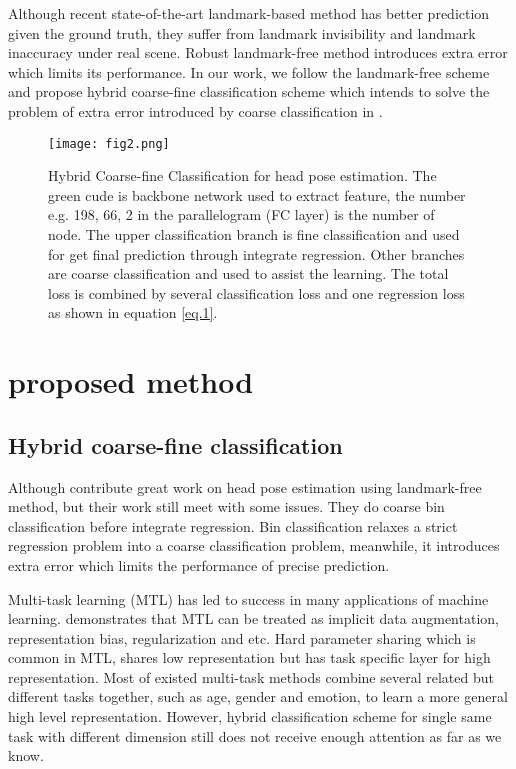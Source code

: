 \documentclass{article}
\begin{document}
\begin{CJK*}{UTF8}{gkai}
Although recent state-of-the-art landmark-based method has better prediction given the ground truth, they suffer from landmark invisibility and landmark inaccuracy under real scene. Robust landmark-free method introduces extra error which limits its performance. In our work, we follow the landmark-free scheme and propose hybrid coarse-fine classification scheme which intends to solve the problem of extra error introduced by coarse classification in \cite{ruiz2017fine}.

\begin{figure*}[h]
\centering
\texttt{[image: fig2.png]}
\caption{Hybrid Coarse-fine Classification for head pose estimation. The green cude is backbone network used to extract feature, the number e.g. 198, 66, 2 in the parallelogram (FC layer) is the number of node. The upper classification branch is fine classification and used for get final prediction through integrate regression. Other branches are coarse classification and used to assist the learning. The total loss is combined by several classification loss and one regression loss as shown in equation \eqref{eq.1}.}
\end{figure*}

\section{proposed method}
\label{sec:majhead}

\subsection{Hybrid coarse-fine classification}
\label{ssec:subhead}
Although \cite{ruiz2017fine} contribute great work on head pose estimation using landmark-free method, but their work still meet with some issues. They do coarse bin classification before integrate regression. Bin classification relaxes a strict regression problem into a coarse classification problem, meanwhile, it introduces extra error which limits the performance of precise prediction. 

Multi-task learning (MTL) has led to success in many applications of machine learning. \cite{ruder2017overview} demonstrates that MTL can be treated as implicit data augmentation, representation bias, regularization and etc. Hard parameter sharing which is common in MTL, shares low representation but has task specific layer for high representation. Most of existed multi-task methods combine several related but different tasks together, such as age, gender and emotion, to learn a more general high level representation. However, hybrid classification scheme for single same task with different dimension still does not receive enough attention as far as we know.


\end{CJK*}
\end{document}
